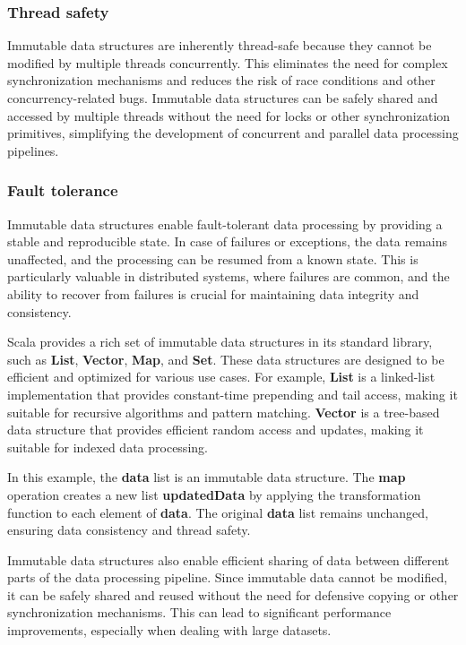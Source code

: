 \subsubsection{Thread safety}

Immutable data structures are inherently thread-safe because they cannot be modified by multiple threads concurrently. This eliminates the need for complex synchronization mechanisms and reduces the risk of race conditions and other concurrency-related bugs. Immutable data structures can be safely shared and accessed by multiple threads without the need for locks or other synchronization primitives, simplifying the development of concurrent and parallel data processing pipelines.

\subsubsection{Fault tolerance}

Immutable data structures enable fault-tolerant data processing by providing a stable and reproducible state. In case of failures or exceptions, the data remains unaffected, and the processing can be resumed from a known state. This is particularly valuable in distributed systems, where failures are common, and the ability to recover from failures is crucial for maintaining data integrity and consistency.

Scala provides a rich set of immutable data structures in its standard library, such as \textbf{List}, \textbf{Vector}, \textbf{Map}, and \textbf{Set}. These data structures are designed to be efficient and optimized for various use cases. For example, \textbf{List} is a linked-list implementation that provides constant-time prepending and tail access, making it suitable for recursive algorithms and pattern matching. \textbf{Vector} is a tree-based data structure that provides efficient random access and updates, making it suitable for indexed data processing.



In this example, the \textbf{data} list is an immutable data structure. The \textbf{map} operation creates a new list \textbf{updatedData} by applying the transformation function to each element of \textbf{data}. The original \textbf{data} list remains unchanged, ensuring data consistency and thread safety.

Immutable data structures also enable efficient sharing of data between different parts of the data processing pipeline. Since immutable data cannot be modified, it can be safely shared and reused without the need for defensive copying or other synchronization mechanisms. This can lead to significant performance improvements, especially when dealing with large datasets.

